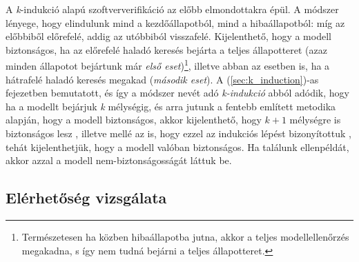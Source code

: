 \newline
\newline
A \emph{k}-indukció alapú szoftververifikáció az előbb elmondottakra épül. A módszer lényege, hogy elindulunk mind a kezdőállapotból, mind a hibaállapotból: míg az előbbiből előrefelé, addig az utóbbiból visszafelé. Kijelenthető, hogy a modell biztonságos, ha az előrefelé haladó keresés bejárta a teljes állapotteret (azaz minden állapotot bejártunk már \emph{első eset})\footnote{Természetesen ha közben hibaállapotba jutna, akkor a teljes modellellenőrzés megakadna, s így nem tudná bejárni a teljes állapotteret.}, illetve abban az esetben is, ha a hátrafelé haladó keresés megakad (\emph{második eset}).
\newline
\newline
A (\ref{sec:k_induction})-as fejezetben bemutatott, és így a módszer nevét adó \emph{k-indukció} abból adódik, hogy ha a modellt bejárjuk \emph{k} mélységig, és arra jutunk a fentebb említett metodika alapján, hogy a modell biztonságos, akkor kijelenthető, hogy $k+1$ mélységre is biztonságos lesz \cite{donaldson_cikk}, illetve mellé az is, hogy ezzel az indukciós lépést bizonyítottuk \cite{k_induction_article}, tehát kijelenthetjük, hogy a modell valóban biztonságos. Ha találunk ellenpéldát, akkor azzal a modell nem-biztonságosságát láttuk be.

\subsection{Elérhetőség vizsgálata}

